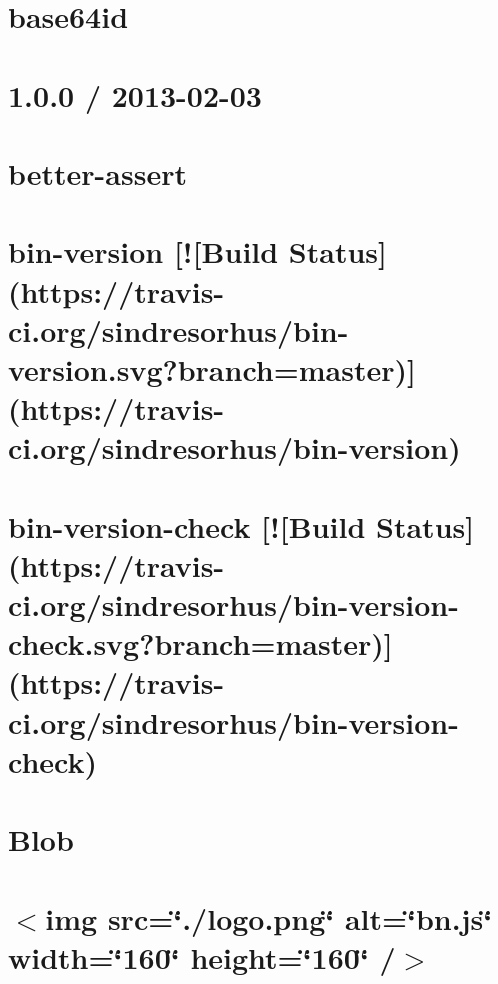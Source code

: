 \documentclass[twoside]{book}
\newcommand{\+}{\discretionary{\mbox{\scriptsize$\hookleftarrow$}}{}{}}
\begin{document}
\chapter{base64id}
\label{md_app_web_node_modules_base64id__r_e_a_d_m_e}

\chapter{1.0.0 / 2013-\/02-\/03}
\label{md_app_web_node_modules_better-assert__history}

\chapter{better-\/assert}
\label{md_app_web_node_modules_better-assert__readme}

\chapter{bin-\/version \mbox{[}!\mbox{[}Build Status\mbox{]}(https\+://travis-\/ci.org/sindresorhus/bin-\/version.svg?branch=master)\mbox{]}(https\+://travis-\/ci.org/sindresorhus/bin-\/version)}
\label{md_app_web_node_modules_bin-version_readme}

\chapter{bin-\/version-\/check \mbox{[}!\mbox{[}Build Status\mbox{]}(https\+://travis-\/ci.org/sindresorhus/bin-\/version-\/check.svg?branch=master)\mbox{]}(https\+://travis-\/ci.org/sindresorhus/bin-\/version-\/check)}
\label{md_app_web_node_modules_bin-version-check_readme}

\chapter{Blob}
\label{md_app_web_node_modules_blob__r_e_a_d_m_e}

\chapter{$<$img src=\char`\"{}./logo.\+png\char`\"{} alt=\char`\"{}bn.\+js\char`\"{} width=\char`\"{}160\char`\"{} height=\char`\"{}160\char`\"{} /$>$}
\label{md_app_web_node_modules_bn_8js__r_e_a_d_m_e}

\end{document}
